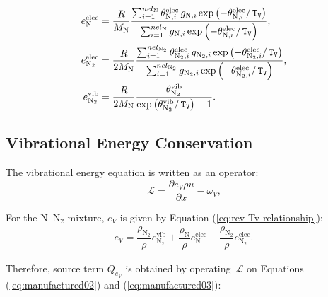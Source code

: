 \documentclass[10pt]{article}
\newcommand{\diff}[2] {\dfrac{\partial #1 }{\partial #2}}
\newcommand{\Lo}{\,\mathcal{L}}
\newcommand{\TV}{\,\mathtt{T_V}}
\newcommand{\N}{\text{N}}
\newcommand{\elec}{\text{elec}}
\newcommand{\vib}{\text{vib}}
\begin{document}
\begin{equation}
\begin{split}\label{eq:aux_02}
e_{\N}^{\elec} &=  \dfrac{R}{M_\N} \dfrac{\sum_{i=1}^{nel_{\N}}  \theta^{\elec}_{\N,i} \, g_{\N,i} \exp\left(- \theta^{\elec}_{\N,i}/ \TV \right)} { \sum_{i=1}^{nel_{\N}} g_{\N,i} \exp\left(-\theta^{\elec}_{\N,i}/\TV\right)},\vspace{5pt}	\\
%
e_{\N_2}^{\elec} &=\dfrac{R}{2 M_\N} \dfrac{\sum_{i=1}^{nel_{\N_2}}  \theta^{\elec}_{\N_2,i} \, g_{\N_2,i} \exp\left(- \theta^{\elec}_{\N_2,i} / \TV \right)} {\sum_{i=1}^{nel_{\N_2}} g_{\N_2,i} \exp\left(-\theta^{\elec}_{\N_2,i}/\TV\right)} \vspace{5pt},	\\
%
e_{\N_2}^{\vib} &= \dfrac{R}{2 M_\N} \frac{\theta^{\vib}_{\N_2}}{\exp\left(\theta^{\vib}_{\N_2}/ \TV \right) - 1} .
\end{split}
\end{equation}



\subsection{Vibrational Energy Conservation}
The vibrational energy equation is written as an operator:
\begin{equation*}
 \label{eq:euler1d_15}
\Lo =\diff{e_V \rho u }{x}-\dot{\omega}_V ,
\end{equation*}

For the N--N$_2$ mixture, $e_V$ is given by Equation (\ref{eq:rev-Tv-relationship}):
\begin{equation*}
\begin{split}
e_V= \dfrac{\rho_{\N_2}}{\rho} e_{\N_2}^{\vib} + \dfrac{\rho_{\N}}{\rho} e_{\N}^{\elec} + \dfrac{\rho_{\N_2}}{\rho} e_{\N_2}^{\elec}.
\end{split}
\end{equation*}

Therefore, source term $Q_{e_V}$ is obtained by operating $\Lo$ on Equations (\ref{eq:manufactured02}) and (\ref{eq:manufactured03}):
%
\end{document}
